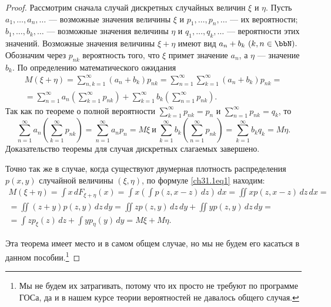 \begin{proof}
Рассмотрим сначала случай дискретных случайных величин $\xi$ и $\eta$. Пусть $a_1,\dots,a_n,\dots$ --- возможные значения величины $\xi$ и $p_1,\dots,p_n,\dots$ --- их вероятности; $b_1,\dots,b_k,\dots$ --- возможные значения величины $\eta$ и $q_1,\dots,q_k,\dots$ --- вероятности этих значений. Возможные значения величины $\xi+\eta$ имеют вид $a_n+b_k\ (k,n\in\bbN).$ Обозначим через $p_{nk}$ вероятность того, что $\xi$ примет значение $a_n$, а $\eta$ --- значение $b_k$. По определению математического ожидания
\begin{multline*}
M(\xi+\eta)=\sum\limits_{n,k=1}^{\infty} (a_n+b_k)p_{nk}=\sum\limits_{n=1}^{\infty}\sum\limits_{k=1}^{\infty} (a_n+b_k)p_{nk}=\\
=\sum\limits_{n=1}^{\infty} a_n \left(\sum\limits_{k=1}^{\infty}p_{nk}\right)+\sum\limits_{k=1}^{\infty} b_k \left(\sum\limits_{n=1}^{\infty}p_{nk}\right).
\end{multline*}
Так как по теореме о полной вероятности $\sum\limits_{k=1}^{\infty}p_{nk}=p_n$ и $\sum\limits_{n=1}^{\infty}p_{nk}=q_k$, то 
$$
\sum\limits_{n=1}^{\infty} a_n \left(\sum\limits_{k=1}^{\infty}p_{nk}\right) = \sum\limits_{n=1}^{\infty} a_n p_n = M\xi\ \text{и}\ \sum\limits_{k=1}^{\infty} b_k \left(\sum\limits_{n=1}^{\infty}p_{nk}\right)=\sum\limits_{k=1}^{\infty} b_k q_k = M\eta.
$$
Доказательство теоремы для случая дискретных слагаемых завершено.

Точно так же в случае, когда существуют двумерная плотность распределения $p(x,y)$ случайной величины $(\xi,\eta)$, по формуле \eqref{ch31.1eq1} находим:
\begin{multline*}
M(\xi+\eta)=\int x\,dF_{\xi+\eta}(x)=\int x \left(\int p(z,x-z)\,dz\right)\,dx=\iint xp(z,x-z)\,dz\,dx=\\=\iint (z+y) p(z,y)\,dz\,dy=\iint z p(z,y)\,dz\,dy + \iint y p(z,y)\,dz\,dy=\\=\int z p_\xi(z)\,dz + \int y p_\eta (y)\,dy= M\xi+M\eta.
\end{multline*}

Эта теорема имеет место и в самом общем случае, но мы не будем его касаться в данном пособии.\footnote{Мы не будем их затрагивать, потому что их просто не требуют по программе ГОСа, да и в нашем курсе теории вероятностей не давалось общего случая.}
\end{proof}

